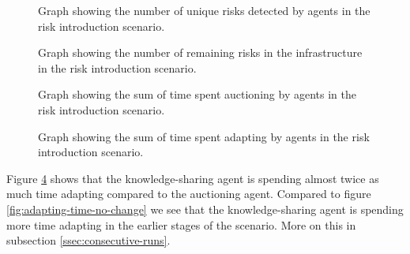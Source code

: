 \begin{figure}[H]
    \centering
        
    \caption{Graph showing the number of unique risks detected by agents in the risk introduction scenario.}
    \label{fig:risk-count-risk-introduction}
\end{figure}
\begin{figure}[H]
    \centering
        
    \caption{Graph showing the number of remaining risks in the infrastructure in the risk introduction scenario.}
    \label{fig:risk-remaining-risk-introduction}
\end{figure}
\begin{figure}[H]
    \centering
        
    \caption{Graph showing the sum of time spent auctioning by agents in the risk introduction scenario.}
    \label{fig:auctioning-time-risk-introduction}
\end{figure}
\begin{figure}[H]
    \centering
        
    \caption{Graph showing the sum of time spent adapting by agents in the risk introduction scenario.}
    \label{fig:adapting-time-risk-introduction}
\end{figure}

Figure \ref{fig:adapting-time-risk-introduction} shows that the knowledge-sharing agent is spending almost twice as much time adapting compared to the auctioning agent. Compared to figure \ref{fig:adapting-time-no-change} we see that the knowledge-sharing agent is spending more time adapting in the earlier stages of the scenario. More on this in subsection \ref{ssec:consecutive-runs}.

